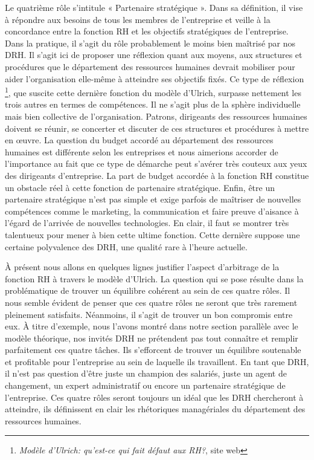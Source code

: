 \documentclass[a4paper, 12pt]{article}
\begin{document}
Le quatrième rôle s'intitule « Partenaire stratégique ». Dans sa définition, il vise à répondre aux besoins de tous les membres de l'entreprise et veille à la concordance entre la fonction RH et les objectifs stratégiques de l'entreprise. Dans la pratique, il s'agit du rôle probablement le moins bien maîtrisé par nos DRH. Il s'agit ici de proposer une réflexion quant aux moyens, aux structures et procédures que le département des ressources humaines devrait mobiliser pour aider l'organisation elle-même à atteindre ses objectifs fixés. Ce type de réflexion \footnote{\textit{Modèle d'Ulrich: qu'est-ce qui fait défaut aux RH?}, site web}, que suscite cette dernière fonction du modèle d'Ulrich, surpasse nettement les trois autres en termes de compétences. Il ne s'agit plus de la sphère individuelle mais bien collective de l'organisation. Patrons, dirigeants des ressources humaines doivent se réunir, se concerter et discuter de ces structures et procédures à mettre en œuvre. La question du budget accordé au département des ressources humaines est différente selon les entreprises et nous aimerions accorder de l'importance au fait que ce type de démarche peut s'avérer très couteux aux yeux des dirigeants d'entreprise. La part de budget accordée à la fonction RH constitue un obstacle réel à cette fonction de partenaire stratégique. 
Enfin, être un partenaire stratégique n'est pas simple et exige parfois de maîtriser de nouvelles compétences comme le marketing, la communication et faire preuve d'aisance à l'égard de l'arrivée de nouvelles technologies. En clair, il faut se montrer très talentueux pour mener à bien cette ultime fonction. Cette dernière suppose une certaine polyvalence des DRH, une qualité rare à l'heure actuelle. 



À présent nous allons en quelques lignes justifier l'aspect d'arbitrage de la fonction RH à travers le modèle d'Ulrich. La question qui se pose résulte dans la problématique de trouver un équilibre cohérent au sein de ces quatre rôles. Il nous semble évident de penser que ces quatre rôles ne seront que très rarement pleinement satisfaits. Néanmoins, il s'agit de trouver un bon compromis entre eux. À titre d'exemple, nous l'avons montré dans notre section parallèle avec le modèle théorique, nos invités DRH ne prétendent pas tout connaître et remplir parfaitement ces quatre tâches. Ils s'efforcent de trouver un équilibre soutenable et profitable pour l'entreprise au sein de laquelle ils travaillent. En tant que DRH, il n'est pas question d'être juste un champion des salariés, juste un agent de changement, un expert administratif ou encore un partenaire stratégique de l'entreprise. Ces quatre rôles seront toujours un idéal que les DRH chercheront à atteindre, ils définissent en clair les rhétoriques managériales du département des ressources humaines. 
\end{document}
